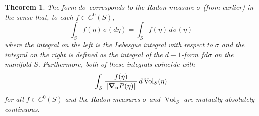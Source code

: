 \documentclass{article}
\newcommand\supp{\operatorname{Supp}}
\theoremstyle{theorem}
\newtheorem{theorem}{Theorem}[section]
\newtheorem{proposition}[theorem]{Proposition}
\newcommand{\Vol}{\operatorname{Vol}}
\begin{document}
\begin{theorem}
The form $d\sigma$ corresponds to the Radon measure $\sigma$ (from earlier) in the sense that, to each $f\in C^0(S)$,
\begin{equation*}
\int_S f(\eta)\,\sigma(d\eta)=\int_S f(\eta)\,d\sigma(\eta)
\end{equation*}
where the integral on the left is the Lebesgue integral with respect to $\sigma$ and the integral on the right is defined as the integral of the $d-1$-form $f d\sigma$ on the manifold $S$. Furthermore, both of these integrals coincide with 
\begin{equation*}
\int_S \frac{f(\eta)}{\norm{\grad_{\mathbf{u}}P(\eta)}}\,d\Vol_S(\eta)
\end{equation*}
for all $f\in C^0(S)$ and the Radon measures $\sigma$ and $\Vol_S$ are mutually absolutely continuous.
\end{theorem}

\end{document}
